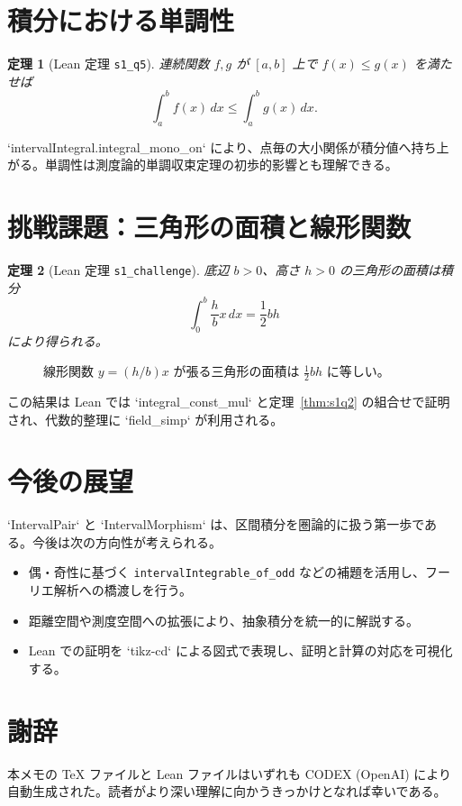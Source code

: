 \documentclass[luatex]{ltjsarticle}
\theoremstyle{definition}
\theoremstyle{plain}
\newtheorem{theorem}{定理}
\theoremstyle{remark}
\begin{document}
\section{積分における単調性}
\begin{theorem}[Lean 定理 \texttt{s1\_q5}]
\label{thm:s1q5}
連続関数 \(f,g\) が \([a,b]\) 上で \(f(x)\le g(x)\) を満たせば
\[
\int_a^b f(x)\,dx \le \int_a^b g(x)\,dx.
\]
\end{theorem}

`intervalIntegral.integral_mono_on` により、点毎の大小関係が積分値へ持ち上がる。単調性は測度論的単調収束定理の初歩的影響とも理解できる。

\section{挑戦課題：三角形の面積と線形関数}
\begin{theorem}[Lean 定理 \texttt{s1\_challenge}]
\label{thm:challenge}
底辺 \(b>0\)、高さ \(h>0\) の三角形の面積は積分
\[
\int_{0}^{b} \frac{h}{b}x\,dx = \frac{1}{2} b h
\]
により得られる。
\end{theorem}

\begin{figure}[h]
\centering
{}
\caption{線形関数 \(y=(h/b)x\) が張る三角形の面積は \(\tfrac{1}{2}bh\) に等しい。}
\end{figure}

この結果は Lean では `integral_const_mul` と定理~\ref{thm:s1q2} の組合せで証明され、代数的整理に `field_simp` が利用される。

\section{今後の展望}
`IntervalPair` と `IntervalMorphism` は、区間積分を圏論的に扱う第一歩である。今後は次の方向性が考えられる。
\begin{itemize}
  \item 偶・奇性に基づく \texttt{intervalIntegrable\_of\_odd} などの補題を活用し、フーリエ解析への橋渡しを行う。
  \item 距離空間や測度空間への拡張により、抽象積分を統一的に解説する。
  \item Lean での証明を `tikz-cd` による図式で表現し、証明と計算の対応を可視化する。
\end{itemize}

\section*{謝辞}
本メモの TeX ファイルと Lean ファイルはいずれも CODEX (OpenAI) により自動生成された。読者がより深い理解に向かうきっかけとなれば幸いである。
\end{document}
